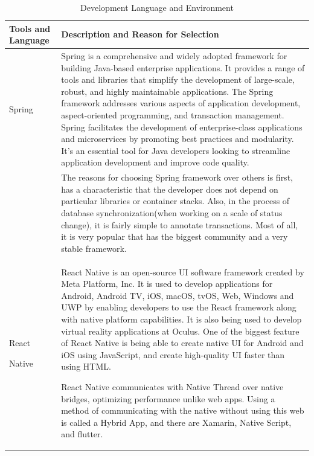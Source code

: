 \documentclass[conference]{IEEEtran}
\begin{document}
    \begin{table}[htbp]
        \caption{Development Language and Environment}
        \centering
        \begin{xtabular}{| p{1.2cm}|p{6.8cm} |} 
             \hline
             Tools and Language & Description and Reason for Selection \\ [0.5ex]
             \hline
             Spring & Spring is a comprehensive and widely adopted framework for building Java-based enterprise applications. It provides a range of tools and libraries that simplify the development of large-scale, robust, and highly maintainable applications. The Spring framework addresses various aspects of application development, aspect-oriented programming, and transaction management. Spring facilitates the development of enterprise-class applications and microservices by promoting best practices and modularity. It's an essential tool for Java developers looking to streamline application development and improve code quality.\\
            &
            The reasons for choosing Spring framework over others is first, has a characteristic that the developer does not depend on particular libraries or container stacks. Also, in the process of database synchronization(when working on a scale of status change), it is fairly simple to annotate transactions. Most of all, it is very popular that has the biggest community and a very stable framework. \\
             \hline
             React
             
             Native & React Native is an open-source UI software framework created by Meta Platform, Inc. It is used to develop applications for Android, Android TV, iOS, macOS, tvOS, Web, Windows and UWP by enabling developers to use the React framework along with native platform capabilities. It is also being used to develop virtual reality applications at Oculus. One of the biggest feature of React Native is being able to create native UI for Android and iOS using JavaScript, and create high-quality UI faster than using HTML. 
             
            React Native communicates with Native Thread over native bridges, optimizing performance unlike web apps. Using a method of communicating with the native without using this web is called a Hybrid App, and there are Xamarin, Native Script, and flutter.
            

\end{xtabular}
\end{table}
\end{document}
